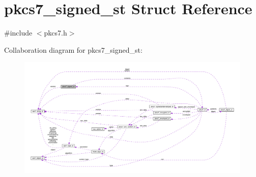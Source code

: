 \hypertarget{structpkcs7__signed__st}{}\section{pkcs7\+\_\+signed\+\_\+st Struct Reference}
\label{structpkcs7__signed__st}


{\ttfamily \#include $<$pkcs7.\+h$>$}



Collaboration diagram for pkcs7\+\_\+signed\+\_\+st\+:\nopagebreak
\begin{figure}[H]
\begin{center}
\leavevmode
\includegraphics[width=350pt]{structpkcs7__signed__st__coll__graph}
\end{center}
\end{figure}
